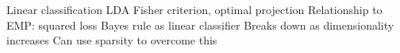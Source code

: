 Linear classification
LDA
Fisher criterion, optimal projection
Relationship to EMP: squared loss
Bayes rule as linear classifier
Breaks down as dimensionality increases
Can use sparsity to overcome this
